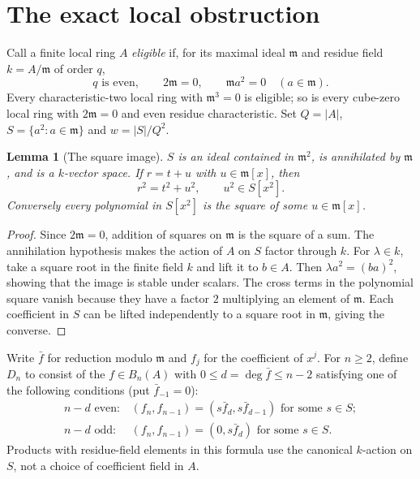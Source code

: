 \documentclass[11pt]{article}
\newtheorem{lemma}[theorem]{Lemma}
\theoremstyle{remark}\newtheorem{remark}[theorem]{Remark}
\newcommand{\m}{\mathfrak m}
\begin{document}
\section{The exact local obstruction}
Call a finite local ring $A$ \emph{eligible} if, for its maximal ideal $\m$ and residue field $k=A/\m$ of order $q$,
\begin{equation}\label{eq:hyp}
 q\text{ is even},\qquad 2\m=0,\qquad
 \m a^2=0\quad(a\in\m).
\end{equation}
Every characteristic-two local ring with $\m^3=0$ is eligible; so is every cube-zero local ring with $2\m=0$ and even residue characteristic. Set $Q=|A|$, $S=\{a^2:a\in\m\}$ and $w=|S|/Q^2$.

\begin{lemma}[The square image]\label{lem:image}
$S$ is an ideal contained in $\m^2$, is annihilated by $\m$, and is a $k$-vector space. If $r=t+u$ with $u\in\m[x]$, then
\[
 r^2=t^2+u^2,\qquad u^2\in S[x^2].
\]
Conversely every polynomial in $S[x^2]$ is the square of some $u\in\m[x]$.
\end{lemma}
\begin{proof}
Since $2\m=0$, addition of squares on $\m$ is the square of a sum. The annihilation hypothesis makes the action of $A$ on $S$ factor through $k$. For $\lambda\in k$, take a square root in the finite field $k$ and lift it to $b\in A$. Then $\lambda a^2=(ba)^2$, showing that the image is stable under scalars. The cross terms in the polynomial square vanish because they have a factor $2$ multiplying an element of $\m$. Each coefficient in $S$ can be lifted independently to a square root in $\m$, giving the converse.
\end{proof}

Write $\bar f$ for reduction modulo $\m$ and $f_j$ for the coefficient of $x^j$. For $n\ge2$, define $D_n$ to consist of the $f\in B_n(A)$ with $0\le d=\deg\bar f\le n-2$ satisfying one of the following conditions (put $\bar f_{-1}=0$):
\begin{equation}\label{eq:D}
\begin{array}{ll}
 n-d\text{ even}: & (f_n,f_{n-1})=(s\bar f_d,s\bar f_{d-1})\text{ for some }s\in S;\\
 n-d\text{ odd}: & (f_n,f_{n-1})=(0,s\bar f_d)\text{ for some }s\in S.
\end{array}
\end{equation}
Products with residue-field elements in this formula use the canonical $k$-action on $S$, not a choice of coefficient field in $A$.
\end{document}
